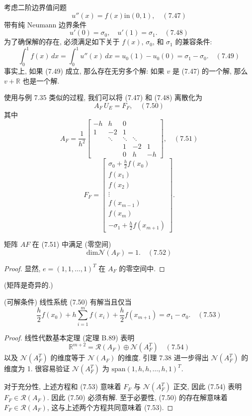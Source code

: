 \documentclass[a4paper]{ctexart}
\newcommand{\hl}[1]
{\noindent {\bf {#1}}}
\begin{document}
{\hl{例 7.37} 考虑二阶边界值问题
$$
u''(x) = f(x) \text{in} (0, 1), \quad (7.47)
$$
带有纯 Neumann 边界条件
$$
u'(0) = \sigma_0, \quad u'(1) = \sigma_1. \quad (7.48)
$$
为了确保解的存在, 必须满足如下关于 $f(x)$, $\sigma_0$, 和 $\sigma_1$ 的兼容条件:
$$
\int_{0}^{1} f(x) \, dx = \int_{0}^{1} u''(x) \, dx 
= u_0(1) - u_0(0) = \sigma_1 - \sigma_0. \quad (7.49)
$$
事实上, 如果 (7.49) 成立, 那么存在无穷多个解: 
如果 $v$ 是 (7.47) 的一个解, 那么 $v + \mathbb{R}$ 也是一个解.

使用与例 7.35 类似的过程, 我们可以将 (7.47) 和 (7.48) 离散化为
$$
A_F \, U_E = F_F, \quad (7.50)
$$
其中
$$
A_F = \frac{1}{h^2}
\begin{bmatrix}
-h & h & 0 &  &  \\
1 & -2 & 1 &  &  \\
 & \ddots & \ddots & \ddots & \\
&&1 & -2 & 1 \\
&&0&h & -h
\end{bmatrix}, \quad (7.51)
$$
$$
F_F = \begin{bmatrix}
\sigma_0 + \frac{h}{2}f(x_0) \\
f(x_1) \\
f(x_2) \\
\vdots \\
f(x_{m-1}) \\
f(x_m) \\
-\sigma_1 + \frac{h}{2}f(x_{m+1})
\end{bmatrix}.
$$

\hl{引理 7.38} 矩阵 $AF$ 在 (7.51) 中满足 (零空间)
$$
\mathrm{dim} \mathscr{N}(A_F) = 1. \quad (7.52)
$$

\begin{proof}
显然, $e = (1, 1, \ldots, 1)^T$ 在 $A_F$ 的零空间中. 
\end{proof}
(矩阵是奇异的.)

\hl{定理 7.39}(可解条件) 线性系统 (7.50) 有解当且仅当
$$
\frac{h}{2}f(x_0) 
+ h\sum_{i = 1}^{m} f(x_i) 
+ \frac{h}{2}f(x_{m + 1}) = \sigma_1 - \sigma_0. \quad (7.53)
$$

\begin{proof}
线性代数基本定理 (定理 B.89) 表明
$$
  \mathbb{R}^{m + 2} = \mathscr{R}(A_F) \oplus \mathscr{N}(A_F^T) \quad (7.54)
  $$
以及 $\mathscr{N}(A_F^T)$ 的维度等于 $\mathscr{N}(A_F)$ 的维度. 
引理 7.38 进一步得出 $\mathscr{N}(A_F^T)$ 的维度为 1. 
很容易验证 $\mathscr{N}(A_F^T)$ 为 $\mathrm{span}(1, h, h, \ldots, h, 1)^T$.
  
对于充分性, 上述方程和 (7.53) 意味着 $F_F$ 与 $\mathscr{N}(A_F^T)$ 正交, 
因此 (7.54) 表明 $F_F \in \mathscr{R}(A_F)$. 
因此 (7.50) 必须有解. 至于必要性, (7.50) 的存在解意味着 
$F_F \in \mathscr{R}(A_F)$, 这与上述两个方程共同意味着 (7.53).     
\end{proof}

}
\end{document}
